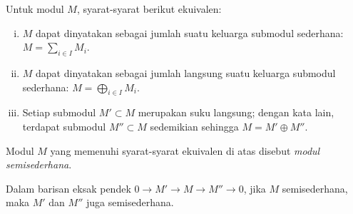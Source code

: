 \begin{proposition}
	Untuk modul $M$, syarat-syarat berikut ekuivalen:
	\begin{enumerate}[(i)]
		\item $M$ dapat dinyatakan sebagai jumlah suatu keluarga submodul sederhana: $M = \sum_{i \in I} M_i$.
		\item $M$ dapat dinyatakan sebagai jumlah langsung suatu keluarga submodul sederhana: $M = \bigoplus_{i \in I} M_i$.
		\item Setiap submodul $M' \subset M$ merupakan suku langsung; dengan kata lain, terdapat submodul $M'' \subset M$ sedemikian sehingga $M = M' \oplus M''$.
	\end{enumerate}
	Modul $M$ yang memenuhi syarat-syarat ekuivalen di atas disebut \emph{modul semisederhana}.
	
	Dalam barisan eksak pendek $0 \to M' \to M \to M'' \to 0$, jika $M$ semisederhana, maka $M'$ dan $M''$ juga semisederhana.
\end{proposition}
